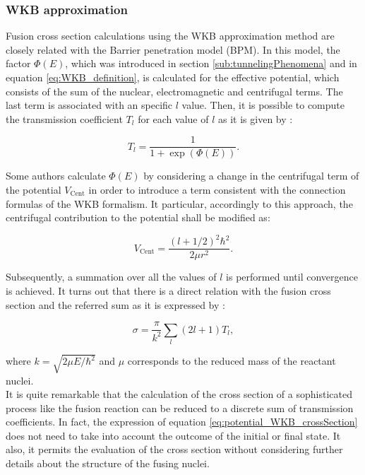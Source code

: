 \documentclass[openany]{book}
\begin{document}
\subsubsection{WKB approximation} \label{ssub:potential_calculations_WKB}

Fusion cross section calculations using the WKB approximation method are closely related with the Barrier penetration model (BPM). In this model,  the factor $\Phi(E)$, which was introduced in section \ref{sub:tunnelingPhenomena} and in equation \ref{eq:WKB_definition}, is calculated for the effective potential, which consists of the sum of the nuclear, electromagnetic and centrifugal terms. The last term is associated with an specific $l$ value. Then, it is possible to compute the transmission coefficient $T_l$ for each value of $l$ as it is given by \cite{koyuncu_soylu_2018}:

\begin{equation} \label{eq:potential_WKB_transmission}
	T_l =  \frac{1}{1 + \exp ({\Phi(E)} )}.
\end{equation}

Some authors calculate $\Phi(E)$ by considering a change in the centrifugal term of the potential $V_{\mathrm{Cent}}$ in order to introduce a term consistent with the connection formulas of the WKB formalism. It particular, accordingly to this approach, the centrifugal contribution to the potential shall be modified as: 

\begin{equation} \label{eq:potential_WKB_modified_centrifugal}
	V_{\mathrm{Cent}} = \frac{(l + 1/2)^2 \hbar^2}{2\mu r^2}.
\end{equation}

Subsequently, a summation over all the values of $l$ is performed until convergence is achieved. It turns out that there is a direct relation with the fusion cross section and the referred sum as it is expressed by \cite{koyuncu_soylu_2018, nobre_chamon_gasques_carlson_thompson_2007}:

\begin{equation} \label{eq:potential_WKB_crossSection}
	\sigma = \frac{\pi}{k^2} \sum_{l}{(2l + 1)T_l},  
\end{equation}

where $k = \sqrt{2\mu E / \hbar^2}$ and $\mu$ corresponds to the reduced mass of the reactant nuclei.  \\

It is quite remarkable that the calculation of the cross section of a sophisticated process like the fusion reaction can be reduced to a discrete sum of transmission coefficients. In fact, the expression of equation \ref{eq:potential_WKB_crossSection} does not need to take into account the outcome of the initial or final state. It also, it permits the evaluation of the cross section without considering further details about the structure of the fusing nuclei.  \\
\end{document}
